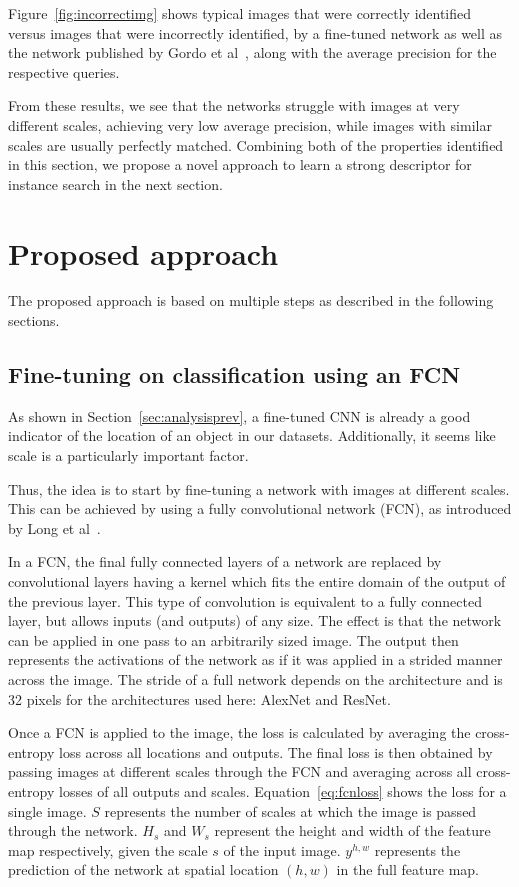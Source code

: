 Figure~\ref{fig:incorrectimg}
shows typical images that were correctly identified versus images that
were incorrectly identified, by a fine-tuned network as well as the network
published by Gordo et al~\cite{gordo_deep_2016}, along with the average
precision for the respective queries.

From these results, we see that the networks struggle with images at
very different scales, achieving very low average precision,
while images with similar scales are usually perfectly matched.
Combining both of the properties identified in this section, we
propose a novel approach to learn a strong descriptor for instance
search in the next section.

\section{Proposed approach}
The proposed approach is based on multiple steps as described in the
following sections.

\subsection{Fine-tuning on classification using an FCN}\label{sec:fcnfinetune}
As shown in Section~\ref{sec:analysisprev}, a fine-tuned CNN is already
a good indicator of the location of an object in our datasets.
Additionally, it seems like scale is a particularly important factor.

Thus, the idea is to start by fine-tuning a network with images
at different scales. This can be achieved by using a fully
convolutional network (FCN), as introduced by
Long et al~\cite{long_fully_2015}.

In a FCN, the final fully connected layers
of a network are replaced by convolutional layers having a kernel
which fits the entire domain of the output of the previous layer.
This type of convolution is equivalent to a fully connected layer,
but allows inputs (and outputs) of any size.
The effect is that the network can be applied in one pass to an
arbitrarily sized image. The output then represents the activations
of the network as if it was applied in a strided manner across the image.
The stride of a full network depends on the architecture and is 32
pixels for the architectures used here: AlexNet and ResNet.

Once a FCN is applied to the image, the loss
is calculated by averaging the cross-entropy loss across all locations
and outputs.
The final loss is then obtained by passing images at different scales
through the FCN and averaging across all cross-entropy losses of all
outputs and scales. Equation~\ref{eq:fcnloss} shows the loss for a
single image. $S$ represents the number of scales at which the image
is passed through the network.
$H_s$ and $W_s$ represent the height and width of the feature
map respectively, given the scale $s$ of the input image. $y^{h,w}$
represents the prediction of the network at spatial location
$(h,w)$ in the full feature map.

